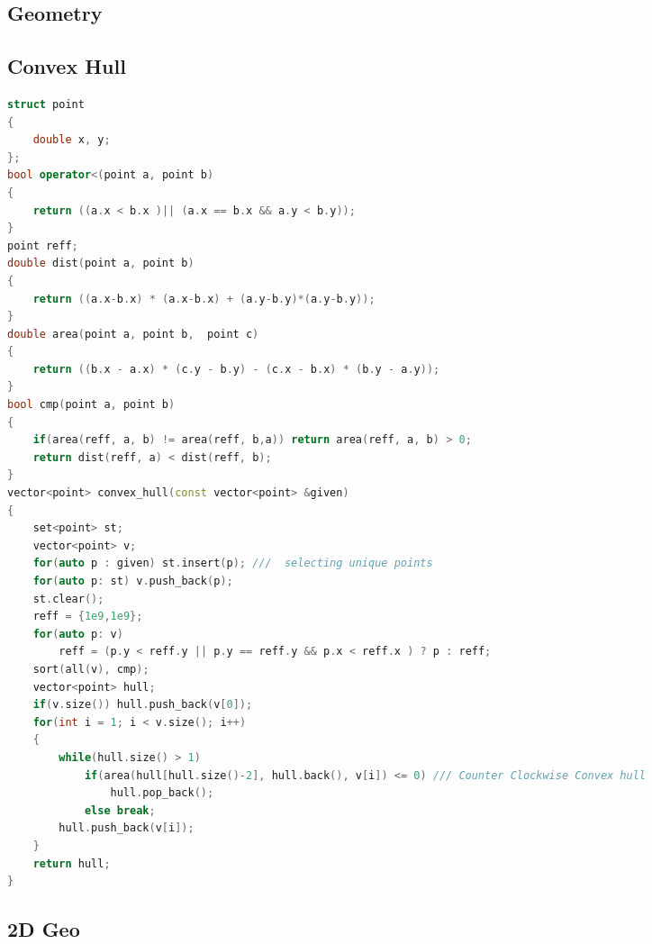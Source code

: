 \documentclass[10pt,a4paper,landscape]{article}
\begin{document}
\begin{multicols}{3}
\section{Geometry}

\subsection{Convex Hull}
\begin{lstlisting}[language = C++, breaklines=true]
struct point
{
    double x, y;
};
bool operator<(point a, point b)
{
    return ((a.x < b.x )|| (a.x == b.x && a.y < b.y));
}
point reff;
double dist(point a, point b)
{
    return ((a.x-b.x) * (a.x-b.x) + (a.y-b.y)*(a.y-b.y));
}
double area(point a, point b,  point c)
{
    return ((b.x - a.x) * (c.y - b.y) - (c.x - b.x) * (b.y - a.y));
}
bool cmp(point a, point b)
{
    if(area(reff, a, b) != area(reff, b,a)) return area(reff, a, b) > 0;
    return dist(reff, a) < dist(reff, b);
}
vector<point> convex_hull(const vector<point> &given)
{
    set<point> st;
    vector<point> v;
    for(auto p : given) st.insert(p); ///  selecting unique points
    for(auto p: st) v.push_back(p);
    st.clear();
    reff = {1e9,1e9};
    for(auto p: v)
        reff = (p.y < reff.y || p.y == reff.y && p.x < reff.x ) ? p : reff;
    sort(all(v), cmp);
    vector<point> hull;
    if(v.size()) hull.push_back(v[0]);
    for(int i = 1; i < v.size(); i++)
    {
        while(hull.size() > 1)
            if(area(hull[hull.size()-2], hull.back(), v[i]) <= 0) /// Counter Clockwise Convex hull
                hull.pop_back();
            else break;
        hull.push_back(v[i]);
    }
    return hull;
}
\end{lstlisting}

\subsection{2D Geo}


\end{multicols}
\end{document}
